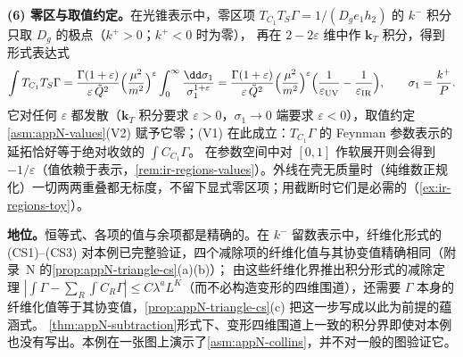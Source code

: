 \begin{example}
\textbf{(6) 零区与取值约定。}在光锥表示中，零区项 $T_{C_1}T_S\Gamma=1/(D_ge_1h_2)$ 的 $k^-$ 积分只取 $D_g$ 的极点（$k^+>0$；$k^+<0$ 时为零），
再在 $2-2\varepsilon$ 维中作 $\mathbf k_T$ 积分，得到形式表达式
\begin{equation}\label{eq:method-zerobin}
\int T_{C_1}T_S\Gamma=\frac{\Gamma(1+\varepsilon)}{\varepsilon\,\tilde Q^2}\Bigl(\frac{\mu^2}{m^2}\Bigr)^{\varepsilon}\int_0^\infty\frac{\dd\sigma_1}{\sigma_1^{1+\varepsilon}}
=\frac{\Gamma(1+\varepsilon)}{\varepsilon\,\tilde Q^2}\Bigl(\frac{\mu^2}{m^2}\Bigr)^{\varepsilon}\Bigl(\frac1{\varepsilon_{\rm UV}}-\frac1{\varepsilon_{\rm IR}}\Bigr),\qquad\sigma_1=\frac{k^+}P .
\end{equation}
它对任何 $\varepsilon$ 都发散（$\mathbf k_T$ 积分要求 $\varepsilon>0$，$\sigma_1\to0$ 端要求 $\varepsilon<0$），取值约定\cref{asm:appN-values}(V2) 赋予它零；(V1) 在此成立：$T_{C_1}\Gamma$ 的 Feynman 参数表示的延拓恰好等于绝对收敛的 $\int C_{C_1}\Gamma$。%
在参数空间中对 $[0,1]$ 作软展开则会得到 $-1/\varepsilon$（值依赖于表示，\cref{rem:ir-regions-values}）。外线在壳无质量时（纯维数正规化）一切两两重叠都无标度，不留下显式零区项；用截断时它们是必需的（\cref{ex:ir-regions-toy}）。

\textbf{地位。}恒等式、各项的值与余项都是精确的。在 $k^-$ 留数表示中，纤维化形式的 (CS1)--(CS3) 对本例已完整验证，四个减除项的纤维化值与其协变值精确相同（附录~N 的\cref{prop:appN-triangle-cs}(a)(b)）；
由这些纤维化界推出积分形式的减除定理 $|\int\Gamma-\sum_R\int C_R\Gamma|\le C\lambda^aL^K$（而不必构造变形的四维围道），还需要 $\Gamma$ 本身的纤维化值等于其协变值，\cref{prop:appN-triangle-cs}(c) 把这一步写成以此为前提的蕴涵式。
\cref{thm:appN-subtraction}形式下、变形四维围道上一致的积分界即使对本例也没有写出。本例在一张图上演示了\cref{asm:appN-collins}，并不对一般的图验证它。
\end{example}

